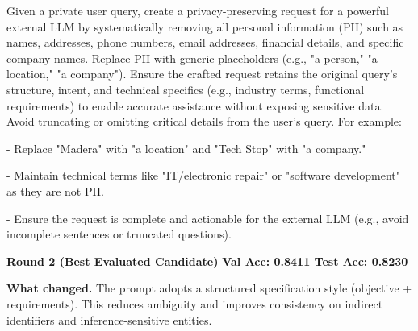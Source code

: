 \begin{prompttext}
Given a private user query, create a privacy-preserving request for a powerful external LLM by systematically removing all personal information (PII) such as names, addresses, phone numbers, email addresses, financial details, and specific company names. Replace PII with generic placeholders (e.g., "a person," "a location," "a company"). Ensure the crafted request retains the original query's structure, intent, and technical specifics (e.g., industry terms, functional requirements) to enable accurate assistance without exposing sensitive data. Avoid truncating or omitting critical details from the user's query. For example:

- Replace "Madera" with "a location" and "Tech Stop" with "a company."

- Maintain technical terms like "IT/electronic repair" or "software development" as they are not PII.

- Ensure the request is complete and actionable for the external LLM (e.g., avoid incomplete sentences or truncated questions).
\end{prompttext}

\begin{roundbox}
\textbf{Round 2 (Best Evaluated Candidate)} \hfill \textbf{Val Acc: 0.8411 \;\; Test Acc: 0.8230}
\end{roundbox}

\noindent \textbf{What changed.} The prompt adopts a structured specification style (objective + requirements). This reduces ambiguity and improves consistency on indirect identifiers and inference-sensitive entities.

